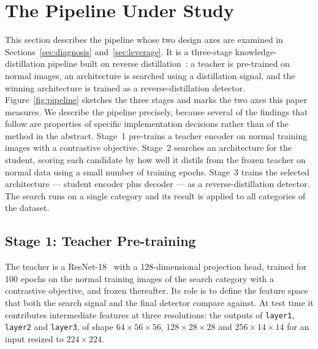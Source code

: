 
\section{The Pipeline Under Study}
\label{sec:method}

This section describes the pipeline whose two design axes are examined in
Sections~\ref{sec:diagnosis} and~\ref{sec:leverage}. It is a three-stage
knowledge-distillation pipeline built on reverse
distillation~\cite{deng2022reverse}: a teacher is pre-trained on normal images,
an architecture is searched using a distillation signal, and the winning
architecture is trained as a reverse-distillation detector.
Figure~\ref{fig:pipeline} sketches the three stages and marks the two axes this
paper measures. We describe the pipeline precisely, because several of the
findings that follow are properties of specific implementation decisions rather
than of the method in the abstract. Stage~1 pre-trains a teacher encoder on normal
training images with a contrastive objective. Stage~2 searches an architecture for
the student, scoring each candidate by how well it distils from the frozen teacher
on normal data using a small number of training epochs. Stage~3 trains the
selected architecture --- student encoder plus decoder --- as a reverse-distillation
detector. The search runs on a single category and its result is applied to all
categories of the dataset.

\subsection{Stage 1: Teacher Pre-training}
\label{subsec:teacher}


The teacher is a ResNet-18~\cite{he2016deep} with a 128-dimensional projection
head, trained for 100 epochs on the normal training images of the search category
with a contrastive objective, and frozen thereafter. Its role is to define the
feature space that both the search signal and the final detector compare against.
At test time it contributes intermediate features at three resolutions: the
outputs of \texttt{layer1}, \texttt{layer2} and \texttt{layer3}, of shape
$64\times56\times56$, $128\times28\times28$ and $256\times14\times14$ for an input
resized to $224\times224$.

